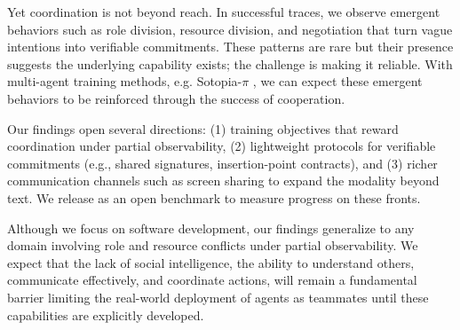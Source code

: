 Yet coordination is not beyond reach. In successful traces, we observe emergent behaviors such as role division, resource division, and negotiation that turn vague intentions into verifiable commitments. These patterns are rare but their presence suggests the underlying capability exists; the challenge is making it reliable. With multi-agent training methods, e.g. Sotopia-$\pi$ \citep{wang2024sotopia, yu2025sotopia}, we can expect these emergent behaviors to be reinforced through the success of cooperation. 

Our findings open several directions: (1) training objectives that reward coordination under partial observability, (2) lightweight protocols for verifiable commitments (e.g., shared signatures, insertion-point contracts), and (3) richer communication channels such as screen sharing to expand the modality beyond text. We release \dataset as an open benchmark to measure progress on these fronts.

Although we focus on software development, our findings generalize to any domain involving role and resource conflicts under partial observability. We expect that the lack of social intelligence, the ability to understand others, communicate effectively, and coordinate actions, will remain a fundamental barrier limiting the real-world deployment of agents as teammates until these capabilities are explicitly developed.
